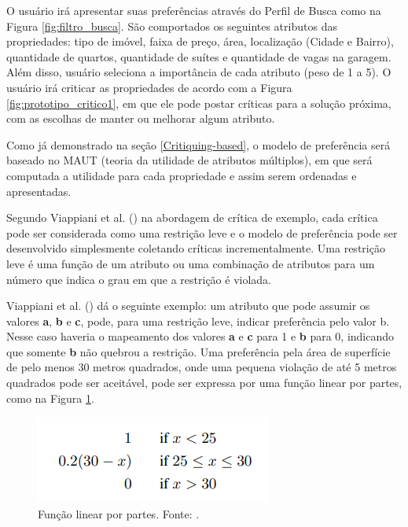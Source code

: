 O usuário irá apresentar suas preferências através do Perfil de Busca como na Figura \ref{fig:filtro_busca}. São comportados os seguintes atributos das propriedades: tipo de imóvel, faixa de preço, área, localização (Cidade e Bairro), quantidade de quartos, quantidade de suítes e quantidade de vagas na garagem. Além disso, usuário seleciona a importância de cada atributo (peso de 1 a 5). O usuário irá criticar as propriedades de acordo com a Figura \ref{fig:prototipo_critico1}, em que ele pode postar críticas para a solução próxima, com as escolhas de manter ou melhorar algum atributo.

Como já demonstrado na seção \ref{Critiquing-based}, o modelo de preferência será baseado no MAUT (teoria da utilidade de atributos múltiplos), em que será computada a utilidade para cada propriedade e assim serem ordenadas e apresentadas.

Segundo Viappiani et al. (\citeyear{Viappiani}) na abordagem de crítica de exemplo, cada crítica pode ser considerada como uma restrição leve e o modelo de preferência pode ser desenvolvido simplesmente coletando críticas incrementalmente. Uma restrição leve é uma função de um atributo ou uma combinação de atributos para um número que indica o grau em que a restrição é violada.

Viappiani et al. (\citeyear{Viappiani}) dá o seguinte exemplo: um atributo que pode assumir os valores \textbf{a}, \textbf{b} e \textbf{c}, pode, para uma restrição leve, indicar preferência pelo valor b. Nesse caso haveria o mapeamento dos valores \textbf{a} e \textbf{c} para 1 e \textbf{b} para 0, indicando que somente \textbf{b} não quebrou a restrição. Uma preferência pela área de superfície de pelo menos 30 metros quadrados, onde uma pequena violação de até 5 metros quadrados pode ser aceitável, pode ser expressa por uma função linear por partes, como na Figura \ref{fig:funcao_linear}.

\begin{figure}[H]
    \centering
    \includegraphics[scale=0.8]{figuras/proposta/funcao_linear.png}
    \caption[Função linear por partes]{Função linear por partes. Fonte: \cite{Viappiani}.}
    \label{fig:funcao_linear}
\end{figure}

